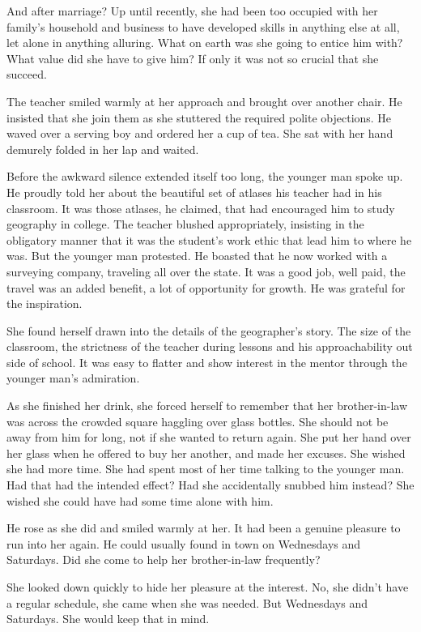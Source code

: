 \documentclass{article}
\newcommand{\egnote}{\todo[color=violet!30]}
\begin{document}
And after marriage? Up until recently, she had been too occupied with her family's household and business to have developed skills in anything else at all, let alone in anything alluring. What on earth was she going to entice him with? What value did she have to give him? If only it was not so crucial that she succeed. 

The teacher smiled warmly at her approach and brought over another chair. He insisted that she join them as she stuttered the required polite objections. He waved over a serving boy and ordered her a cup of tea. She sat with her hand\egnote{hands?} demurely folded in her lap and waited. 

Before the awkward silence extended itself too long, the younger man spoke up. He proudly told her about the beautiful set of atlases his teacher had in his classroom. It was those atlases, he claimed, that had encouraged him to study geography in college. The teacher blushed appropriately, insisting in the obligatory manner that it was the student's work ethic that lead him to where he was. But the younger man protested. He boasted that he now worked with a surveying company, traveling all over the state. It was a good job, well paid, the travel was an added benefit, a lot of opportunity for growth. He was grateful for the inspiration. 

She found herself drawn into the details of the geographer's story. The size of the classroom, the strictness of the teacher during lessons and his approachability out side of school. It was easy to flatter and show interest in the mentor through the younger man's admiration. 

As she finished her drink, she forced herself to remember that her brother-in-law was across the crowded square haggling over glass bottles. She should not be away from him for long, not if she wanted to return again. She put her hand over her glass when he offered to buy her another, and made her excuses. She wished she had more time. She had spent most of her time talking to the younger man. Had that had the intended effect? Had she accidentally snubbed him instead? She wished she could have had some time alone with him.

He rose as she did and smiled warmly at her. It had been a genuine pleasure to run into her again. He could usually \egnote{be} found in town on Wednesdays and Saturdays. Did she come to help her brother-in-law frequently?

She looked down quickly to hide her pleasure at the interest. No, she didn't have a regular schedule, she came when she was needed. But Wednesdays and Saturdays. She would keep that in mind.
\end{document}
